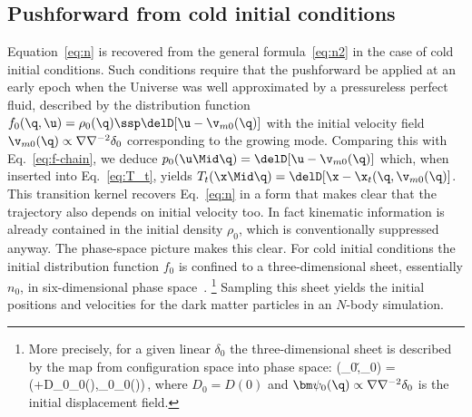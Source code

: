 


\subsection{Pushforward from cold initial conditions}
\noindent Equation~\eqref{eq:n} is recovered from
the general formula~\eqref{eq:n2} in the case of cold initial conditions.
Such conditions require that the pushforward be applied at an early
epoch when the Universe was well approximated by a pressureless
perfect fluid, described
by the distribution function
$f_0(\q,\u)=\rho_0(\q)\ssp\delD[\u-\v_{m0}(\q)]$ with
the initial velocity field $\v_{m0}(\q)\propto\nabla\nabla^{-2}\delta_0$
corresponding to the growing mode.
Comparing this with Eq.~\eqref{eq:f-chain}, we deduce
$p_0(\u\Mid\q)=\delD[\u-\v_{m0}(\q)]$
which, when inserted into Eq.~\eqref{eq:T_t}, yields
$T_t(\x\Mid\q)=\delD[\x-\x_t(\q,\v_{m0}(\q)]$.
This transition kernel recovers Eq.~\eqref{eq:n} in a form
that makes clear that the trajectory also depends on
initial velocity too.
In fact kinematic information is already contained in the
initial density $\rho_0$, which is conventionally suppressed anyway.
The phase-space picture makes this clear.
For cold initial conditions the initial distribution function $f_0$
is confined to a three-dimensional sheet, essentially $n_0$,
in six-dimensional phase space~\citep{Abel:2011ui,Shandarin:2012}.%
\footnote{More precisely,
for a given linear $\delta_0$ the three-dimensional sheet is described by the
map from configuration space into phase space:
\be
\q\mapsto (\x_0,\v_0)
=\big(\q+D_0\ssp\bm\psi_0(\q),_0\ssp\bm\psi_0(\q)\big)\,,
\ee
where $D_0=D(0)$ and $\bm\psi_0(\q)\propto\nabla\nabla^{-2}\delta_0$
is the initial displacement field.
}
Sampling this sheet yields the initial positions and
velocities for the dark matter particles in an $N$-body simulation.

